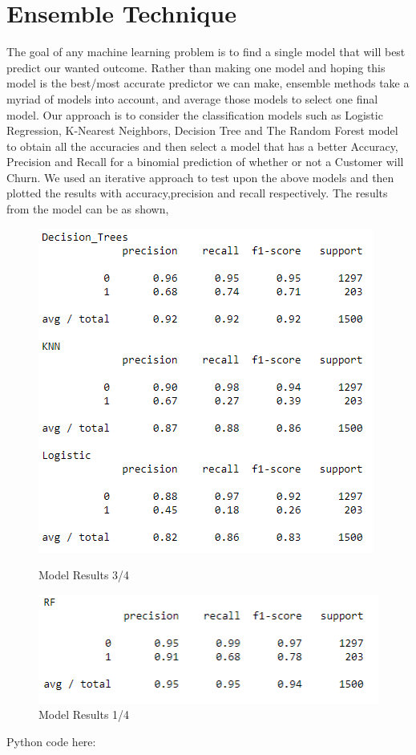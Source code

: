 \documentclass[a4paper,12pt]{report}
\begin{document}
\section{Ensemble Technique}
The goal of any machine learning problem is to find a single model that will best predict our wanted outcome. Rather than making one model and hoping this model is the best/most accurate predictor we can make, ensemble methods take a myriad of models into account, and average those models to select one final model. Our approach is to consider the classification models such as Logistic Regression, K-Nearest Neighbors, Decision Tree and The Random Forest model to obtain all the accuracies and then select a model that has a better Accuracy, Precision and Recall for a binomial prediction of whether or not a Customer will Churn. We used an iterative approach to test upon the above models and then plotted the results with accuracy,precision and recall respectively. The results from the model can be as shown,
\begin{figure}[h]
  \centering
  \begin{minipage}[b]{0.4\textwidth}
    \includegraphics[width=\textwidth]{imb_model_results1.PNG}
     \caption{Model Results 3/4}
  \end{minipage}
  \hfill
  \begin{minipage}[b]{0.4\textwidth}
    \includegraphics[width=\textwidth]{imb_results_2.PNG}
    \caption{Model Results 1/4}
  \end{minipage}
\end{figure}
Python code here: \\
\FloatBarrier
\end{document}
